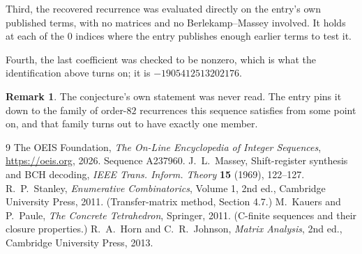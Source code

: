 \documentclass[11pt,a4paper]{article}
\theoremstyle{plain}
\theoremstyle{definition}
\newtheorem{remark}[theorem]{Remark}
\begin{document}
Third, the recovered recurrence was evaluated directly on the entry's own published terms, with
no matrices and no Berlekamp--Massey involved. It holds at each of the $0$ indices where
the entry publishes enough earlier terms to test it.

Fourth, the last coefficient was checked to be nonzero, which is what the identification above
turns on; it is $-1905412513202176$.

\begin{remark}
The conjecture's own statement was never read. The entry pins it down to the family of
order-$82$ recurrences this sequence satisfies from some point on, and that family turns
out to have exactly one member.
\end{remark}

\begin{thebibliography}{9}
 The OEIS Foundation, \emph{The On-Line Encyclopedia of Integer
Sequences}, \url{https://oeis.org}, 2026. Sequence A237960.
 J.~L.~Massey, Shift-register synthesis and BCH decoding, \emph{IEEE
Trans. Inform. Theory} \textbf{15} (1969), 122--127.
 R.~P.~Stanley, \emph{Enumerative Combinatorics}, Volume 1, 2nd ed.,
Cambridge University Press, 2011. (Transfer-matrix method, Section 4.7.)
 M.~Kauers and P.~Paule, \emph{The Concrete Tetrahedron}, Springer, 2011.
(C-finite sequences and their closure properties.)
 R.~A.~Horn and C.~R.~Johnson, \emph{Matrix Analysis}, 2nd ed., Cambridge
University Press, 2013.
\end{thebibliography}
\end{document}
